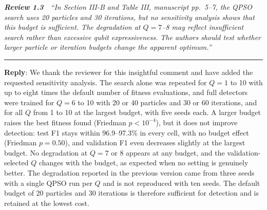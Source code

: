 \documentclass[11pt]{article}
\newcommand{\review}[2]{\par\bigskip\noindent\textbf{\textit{Review #1}}\ \ \textit{``#2''}\par\smallskip\hrule\medskip}
\newcommand{\reply}{\noindent\textbf{Reply}: }
\begin{document}
\review{1.3}{In Section III-B and Table III, manuscript pp.~5--7, the QPSO search uses 20 particles and 30 iterations, but no sensitivity analysis shows that this budget is sufficient. The degradation at $Q=7$--8 may reflect insufficient search rather than excessive qubit expressiveness. The authors should test whether larger particle or iteration budgets change the apparent optimum.}

\reply We thank the reviewer for this insightful comment and have added the
requested sensitivity analysis. The search alone was repeated for $Q=1$ to 10
with up to eight times the default number of fitness evaluations, and full
detectors were trained for $Q=6$ to 10 with 20 or 40 particles and 30 or 60
iterations, and for all $Q$ from 1 to 10 at the largest budget, with five
seeds each. A larger budget raises the best fitness found (Friedman
$p<10^{-4}$), but it does not improve detection: test F1 stays within
96.9--97.3\% in every cell, with no budget effect (Friedman $p=0.50$), and
validation F1 even decreases slightly at the largest budget. No degradation
at $Q=7$ or 8 appears at any budget, and the validation-selected $Q$ changes
with the budget, as expected when no setting is genuinely better. The
degradation reported in the previous version came from three seeds with a
single QPSO run per $Q$ and is not reproduced with ten seeds. The default
budget of 20 particles and 30 iterations is therefore sufficient for
detection and is retained at the lowest cost.
\end{document}

